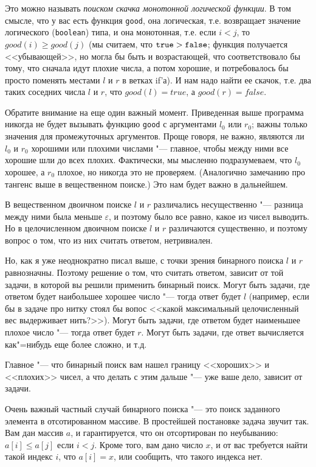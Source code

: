 \documentclass[a4paper,10pt]{problems}
\let\eps\varepsilon
\begin{document}
Это можно называть \textit{поиском скачка монотонной логической функции}. 
В том смысле, что у вас есть функция \verb`good`, она логическая, 
т.е. возвращает значение логического (\verb`boolean`) типа,
и она монотонная, т.е. если $i<j$, то $good(i)\geq good(j)$ 
(мы считаем, что $\verb`true`>\verb`false`$; функция получается <<убывающей>>,
но могла бы быть и возрастающей, что соответствовало бы тому,
что сначала идут плохие числа, а потом хорошие, и потребовалось бы просто поменять местами $l$ и $r$
в ветках if'а). 
И нам надо найти ее скачок, т.е. два таких соседних числа $l$ и $r$, что $good(l)=true$,
а $good(r)=false$.

Обратите внимание на еще один важный момент. 
Приведенная выше программа никогда не будет вызывать функцию \verb`good`
с аргументами $l_0$ или $r_0$; важны только значения для промежуточных аргументов.
Проще говоря, не важно, являются ли $l_0$ и $r_0$ хорошими или плохими числами
"--- главное, чтобы между ними все хорошие шли до всех плохих. 
Фактически, мы мысленно подразумеваем, что $l_0$ хорошее, а $r_0$ плохое, но
никогда это не проверяем.
(Аналогично замечанию про тангенс выше в вещественном поиске.)
Это нам будет важно в дальнейшем.

В вещественном двоичном поиске $l$ и $r$ различались несущественно "--- разница между ними
была меньше $\eps$, и поэтому было все равно, какое из чисел выводить. 
Но в целочисленном двоичном поиске $l$ и $r$ различаются существенно, и поэтому
вопрос о том, что из них считать ответом, нетривиален.

Но, как я уже неоднократно писал выше, с точки зрения бинарного поиска $l$ и $r$ равнозначны.
Поэтому решение о том, что считать ответом, зависит от той задачи, в которой
вы решили применить бинарный поиск. 
Могут быть задачи, где ответом будет наибольшее хорошее число "--- тогда ответ будет $l$
(например, если бы в задаче про нитку стоял бы вопос <<какой максимальный целочисленный вес выдерживает нить?>>).
Могут быть задачи, где ответом будет наименьшее плохое число "--- тогда ответ будет $r$.
Могут быть задачи, где ответ вычисляется как"=нибудь еще более сложно, и т.д.

Главное "--- что бинарный поиск вам нашел границу <<хороших>> и <<плохих>> чисел,
а что делать с этим дальше "--- уже ваше дело, зависит от задачи.

Очень важный частный случай бинарного поиска "--- это поиск заданного элемента в отсотированном массиве.
В простейшей постановке задача звучит так.
Вам дан массив $a$, и гарантируется, что он отсортирован по неубыванию: $a[i]\leq a[j]$ если $i<j$.
Кроме того, вам дано число $x$, и от вас требуется найти такой индекс $i$, что $a[i]=x$,
или сообщить, что такого индекса нет.
\end{document}
